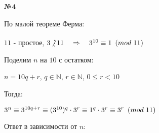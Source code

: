\documentclass{article}
\newenvironment{task}{\begin{center}\fontsize{14}{14}\selectfont\bf}{\rm\fontsize{12}{12}\selectfont\end{center}}
\begin{document}
	\begin{task} 
		№4
	\end{task}
	По малой теореме Ферма:
	\begin{center}
		$11$ - простое, $3 \mathop{\not \raisebox{-2pt}{\vdots}} 11 \quad \Rightarrow \quad 3^{10} \equiv 1 \hspace{5px} (mod \hspace{3px} 11)$
	\end{center}
	Поделим $n$ на $10$ с остатком: \\
	\begin{center}
		$n = 10q + r$, \quad $q \in \mathbb{N}$, $r \in \mathbb{N}$, $0 \leqslant r < 10$
	\end{center}
	Тогда:
	\begin{center}
		$3^n \equiv 3^{10q+r} \equiv (3^{10})^q \cdot 3^r \equiv 1^q \cdot 3^r \equiv 3^r \hspace{5px} (mod \hspace{3px} 11)$ 
	\end{center}
	Ответ в зависимости от $n$:
\end{document}
